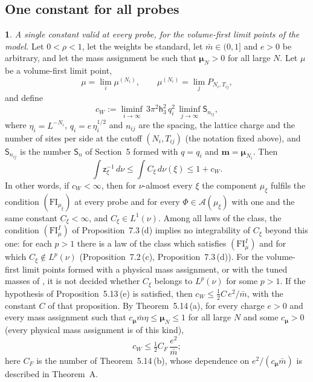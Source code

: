 \documentclass[11pt]{amsart}
\newcommand{\namedhead}{}
\theoremstyle{definition}
\newtheorem*{namedinner}{\namedhead}
\newenvironment{named}[1]{\renewcommand{\namedhead}{#1}\begin{namedinner}}{\end{namedinner}}
\begin{document}
\subsection{One constant for all probes}
\begin{named}{Theorem 7.4}
\emph{A single constant valid at every probe, for the volume-first limit points of the model.}
Let $0<\rho<1$, let the weights be standard, let $\bar m\in(0,1]$ and $e>0$ be arbitrary, and let the mass assignment be such that $\boldsymbol\mu_N>0$ for all large $N$.
Let $\mu$ be a volume-first limit point,
\begin{equation*}
\mu=\lim_i\mu^{(N_i)},\qquad\mu^{(N_i)}=\lim_jP_{N_i,T_{ij}},
\end{equation*}
and define
\begin{equation*}
c_W:=\liminf_{i\to\infty}\,3\pi^2\mathsf h_3^2\,q_i^2\,\liminf_{j\to\infty}\mathsf S_{n_{ij}},
\end{equation*}
where $\eta_i=L^{-N_i}$, $q_i=e\,\eta_i^{1/2}$ and $n_{ij}$ are the spacing, the lattice charge and the number of sites per side at the cutoff $(N_i,T_{ij})$ (the notation fixed above),
and $\mathsf S_{n_{ij}}$ is the number $\mathsf S_n$ of Section~5 formed with $q=q_i$ and $\mathbf m=\boldsymbol\mu_{N_i}$.
Then
\begin{equation*}
\int\mathsf z_\xi^{-1}\,d\nu\le\int C_\xi\,d\nu(\xi)\le1+c_W.
\end{equation*}
In other words, if $c_W<\infty$, then for $\nu$-almost every $\xi$ the component $\mu_\xi$ fulfils the condition $(\mathrm{FI}_{\mu_\xi})$ at every probe and for every $\Phi\in\mathcal A(\mu_\xi)$ with one and the same constant $C_\xi<\infty$, and $C_\xi\in L^1(\nu)$.
Among all laws of the class, the condition $(\mathrm{FI}^I_\mu)$ of Proposition~7.3\,(d) implies no integrability of $C_\xi$ beyond this one:
for each $p>1$ there is a law of the class which satisfies $(\mathrm{FI}^I_\mu)$ and for which $C_\xi\notin L^p(\nu)$ (Proposition~7.2\,(c), Proposition~7.3\,(d)).
For the volume-first limit points formed with a physical mass assignment, or with the tuned masses of \cite{QEDIII}, it is not decided whether $C_\xi$ belongs to $L^p(\nu)$ for some $p>1$.
If the hypothesis of Proposition~5.13\,(e) is satisfied, then $c_W\le\frac12C\,e^2/\bar m$, with the constant $C$ of that proposition.
By Theorem~5.14\,(a), for every charge $e>0$ and every mass assignment such that $c_{\boldsymbol\mu}\bar m\eta\le\boldsymbol\mu_N\le1$ for all large $N$ and some $c_{\boldsymbol\mu}>0$ (every physical mass assignment is of this kind),
\begin{equation*}
c_W\le\tfrac12C_F\,\frac{e^2}{\bar m};
\end{equation*}
here $C_F$ is the number of Theorem~5.14\,(b), whose dependence on $e^2/(c_{\boldsymbol\mu}\bar m)$ is described in Theorem~A.
\end{named}
\end{document}
